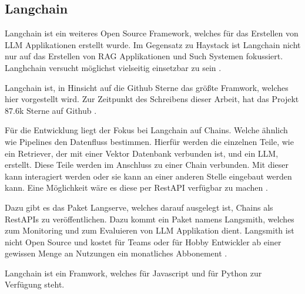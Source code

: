 \subsection{Langchain}
\label{s:intro:lang}
Langchain ist ein weiteres Open Source Framework, welches für das Erstellen von 
LLM Applikationen erstellt wurde. Im Gegensatz zu Haystack ist Langchain nicht 
nur auf das Erstellen von RAG Applikationen und Such Systemen fokussiert. Langhchain 
versucht möglichst vielseitig einsetzbar zu sein \cite{LangChain}.\par
Langchain ist, in Hinsicht auf die Github Sterne das größte Framwork, welches 
hier vorgestellt wird. Zur Zeitpunkt des Schreibens dieser Arbeit, hat das 
Projekt 87.6k Sterne auf Github \cite{chaseLangChain2022}. \par
Für die Entwicklung liegt der Fokus bei Langchain auf Chains. Welche ähnlich
wie Pipelines den Datenfluss bestimmen. Hierfür werden die einzelnen 
Teile, wie ein Retriever, der mit einer Vektor 
Datenbank verbunden ist, und ein LLM, erstellt. Diese Teile werden im Anschluss 
zu einer Chain verbunden. Mit dieser kann interagiert werden oder sie kann an einer anderen 
Stelle eingebaut werden kann. Eine Möglichkeit wäre es diese 
per RestAPI verfügbar zu machen \cite{LangChaina}.\par
Dazu gibt es das Paket Langserve, welches darauf ausgelegt 
ist, Chains als RestAPIs zu veröffentlichen. 
Dazu kommt ein Paket namens Langsmith, welches zum Monitoring 
und zum Evaluieren von LLM Applikation dient. Langsmith ist nicht 
Open Source und kostet für Teams oder für Hobby Entwickler ab einer gewissen
Menge an Nutzungen ein monatliches Abbonement \cite{LangSmith, LangServeLangChain}.\par
Langchain ist ein Framwork, welches für Javascript und für Python zur Verfügung steht. \cite{chaseLangChain2022, IntroductionLangChain}


